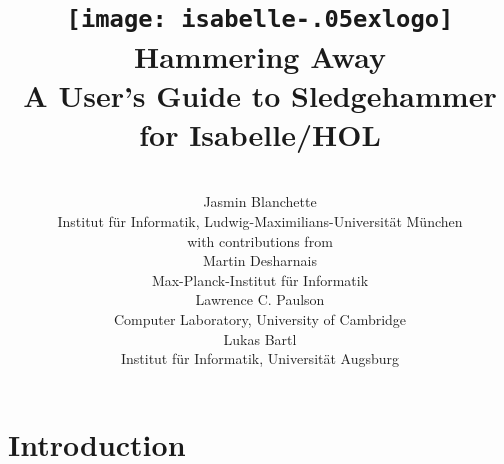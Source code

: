 \documentclass[a4paper,12pt]{article}
\renewcommand\_{\hbox{\textunderscore\kern-.05ex}}
\begin{document}
\renewcommand\labelitemi{\raise.065ex\hbox{\small\textbullet}}

\title{\texttt{[image: isabelle\_logo]} \\[4ex]
Hammering Away \\[\smallskipamount]
\Large A User's Guide to Sledgehammer for Isabelle/HOL}
\author{\hbox{} \\
Jasmin Blanchette \\
{\normalsize Institut f\"ur Informatik, Ludwig-Maximilians-Universit\"at M\"unchen} \\[4\smallskipamount]
{\normalsize with contributions from} \\[4\smallskipamount]
Martin Desharnais \\
{\normalsize Max-Planck-Institut f\"ur Informatik}  \\[4\smallskipamount]
Lawrence C. Paulson \\
{\normalsize Computer Laboratory, University of Cambridge} \\[4\smallskipamount]
Lukas Bartl \\
{\normalsize Institut f\"ur Informatik, Universit\"at Augsburg} \\
\hbox{}}

\maketitle

\newpage
\tableofcontents

\setlength{\parskip}{.7em plus .2em minus .1em}
\setlength{\parindent}{0pt}
\setlength{\abovedisplayskip}{\parskip}
\setlength{\abovedisplayshortskip}{.9\parskip}
\setlength{\belowdisplayskip}{\parskip}
\setlength{\belowdisplayshortskip}{.9\parskip}

\newenvironment{enum}%
    {\begin{list}{}{%
        \setlength{\topsep}{.1\parskip}%
        \setlength{\partopsep}{.1\parskip}%
        \setlength{\itemsep}{\parskip}%
        \advance\itemsep by-\parsep}}
    {\end{list}}

\def\pre{\begingroup\vskip0pt plus1ex\advance\leftskip by\leftmargin
\advance\rightskip by\leftmargin}
\def\post{\vskip0pt plus1ex\endgroup}

\def\prew{\pre\advance\rightskip by-\leftmargin}
\def\postw{\post}


\section{Introduction}
\label{introduction}
\end{document}

